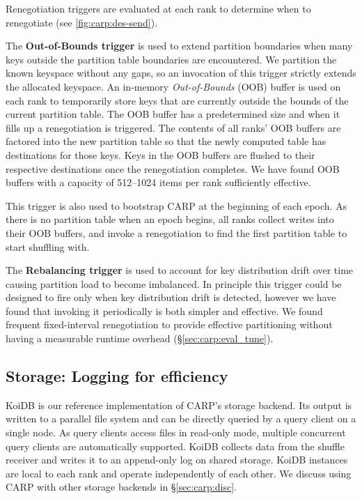 Renegotiation triggers are evaluated at each rank to determine when to renegotiate (see \cref{fig:carp:des-send}).

The \textbf{Out-of-Bounds trigger} is used to extend partition boundaries when many keys outside
the partition table boundaries are encountered.
We partition the known keyspace without any gaps, so an invocation of this trigger strictly extends
the allocated keyspace.
An in-memory \emph{Out-of-Bounds} (OOB) buffer is used on each rank to temporarily store keys that
are currently outside the bounds of the current partition table.
The OOB buffer has a predetermined size and when it fills up a renegotiation is triggered.
The contents of all ranks' OOB buffers are factored into the new partition table so that the newly
computed table has destinations for those keys.
Keys in the OOB buffers are flushed to their respective destinations once the renegotiation
completes.
We have found OOB buffers with a capacity of 512--1024 items per rank sufficiently effective.

This trigger is also used to bootstrap CARP at the beginning of each epoch.
As there is no partition table when an epoch begins, all ranks collect writes into their OOB
buffers, and invoke a renegotiation to find the first partition table to start shuffling with.

The \textbf{Rebalancing trigger} is used to account for key distribution drift over time causing
partition load to become imbalanced.
In principle this trigger could be designed to fire only when key distribution drift is detected,
however we have found that invoking it periodically is both simpler and effective.
We found frequent fixed-interval renegotiation to provide effective partitioning without having a
measurable runtime overhead (\S\ref{sec:carp:eval_tune}).


\subsection{Storage: Logging for efficiency}
\label{sec:carp:des_store}

\figdeskoidb


KoiDB is our reference implementation of CARP's storage backend.
Its output is written to a parallel file system and can be directly queried by a query client on a
single node.
As query clients access files in read-only mode, multiple concurrent query clients are
automatically supported.
KoiDB collects data from the shuffle receiver and writes it to an append-only log on shared
storage.
KoiDB instances are local to each rank and operate independently of each other.
We discuss using CARP with other storage backends in \S\ref{sec:carp:disc}.

